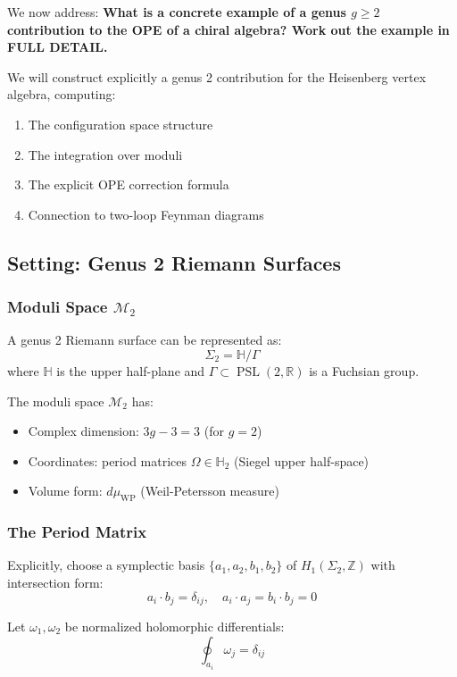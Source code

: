 We now address: \textbf{What is a concrete example of a genus $g \geq 2$ contribution
to the OPE of a chiral algebra? Work out the example in FULL DETAIL.}

We will construct explicitly a genus 2 contribution for the Heisenberg vertex algebra,
computing:
\begin{enumerate}
\item The configuration space structure
\item The integration over moduli
\item The explicit OPE correction formula
\item Connection to two-loop Feynman diagrams
\end{enumerate}

\subsection{Setting: Genus 2 Riemann Surfaces}

\subsubsection{Moduli Space $\mathcal{M}_2$}

A genus 2 Riemann surface can be represented as:
$$\Sigma_2 = \mathbb{H}/\Gamma$$
where $\mathbb{H}$ is the upper half-plane and $\Gamma \subset \operatorname{PSL}(2,\mathbb{R})$
is a Fuchsian group.

The moduli space $\mathcal{M}_2$ has:
\begin{itemize}
\item Complex dimension: $3g - 3 = 3$ (for $g=2$)
\item Coordinates: period matrices $\Omega \in \mathbb{H}_2$ (Siegel upper half-space)
\item Volume form: $d\mu_{\text{WP}}$ (Weil-Petersson measure)
\end{itemize}

\subsubsection{The Period Matrix}

Explicitly, choose a symplectic basis $\{a_1, a_2, b_1, b_2\}$ of $H_1(\Sigma_2, \mathbb{Z})$
with intersection form:
$$a_i \cdot b_j = \delta_{ij}, \quad a_i \cdot a_j = b_i \cdot b_j = 0$$

Let $\omega_1, \omega_2$ be normalized holomorphic differentials:
$$\oint_{a_i} \omega_j = \delta_{ij}$$

